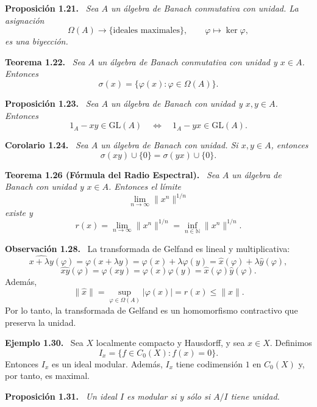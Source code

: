\documentclass[11pt]{article}
\newcommand{\GL}{\mathrm{GL}}
\newenvironment{teorema}[1]
  {\par\medskip\noindent\textbf{Teorema #1.}\ \itshape}
  {\par\medskip}
\newenvironment{proposicion}[1]
  {\par\medskip\noindent\textbf{Proposición #1.}\ \itshape}
  {\par\medskip}
\newenvironment{corolario}[1]
  {\par\medskip\noindent\textbf{Corolario #1.}\ \itshape}
  {\par\medskip}
\newenvironment{observacion}[1]
  {\par\medskip\noindent\textbf{Observación #1.}\ }
  {\par\medskip}
\newenvironment{ejemplo}[1]
  {\par\medskip\noindent\textbf{Ejemplo #1.}\ }
  {\par\medskip}
\begin{document}
\begin{proposicion}{1.21}
Sea $A$ un álgebra de Banach conmutativa con unidad. La asignación
\[
  \Omega(A)\longrightarrow\{\text{ideales maximales}\},
  \qquad
  \varphi\longmapsto\ker\varphi,
\]
es una biyección.
\end{proposicion}

\begin{teorema}{1.22}
Sea $A$ un álgebra de Banach conmutativa con unidad y $x\in A$. Entonces
\[
  \sigma(x)=\{\varphi(x):\varphi\in\Omega(A)\}.
\]
\end{teorema}

\begin{proposicion}{1.23}
Sea $A$ un álgebra de Banach con unidad y $x,y\in A$. Entonces
\[
  1_A-xy\in\GL(A)
  \quad\Longleftrightarrow\quad
  1_A-yx\in\GL(A).
\]
\end{proposicion}

\begin{corolario}{1.24}
Sea $A$ un álgebra de Banach con unidad. Si $x,y\in A$, entonces
\[
  \sigma(xy)\cup\{0\}
  =
  \sigma(yx)\cup\{0\}.
\]
\end{corolario}

\begin{teorema}{1.26 (Fórmula del Radio Espectral)}
Sea $A$ un álgebra de Banach con unidad y $x\in A$. Entonces el límite
\[
  \lim_{n\to\infty}\lVert x^n\rVert^{1/n}
\]
existe y
\[
  r(x)
  =\lim_{n\to\infty}\lVert x^n\rVert^{1/n}
  =\inf_{n\in\mathbb{N}}\lVert x^n\rVert^{1/n}.
\]
\end{teorema}

\begin{observacion}{1.28}
La transformada de Gelfand es lineal y multiplicativa:
\[
  \widehat{x+\lambda y}(\varphi)
  =\varphi(x+\lambda y)
  =\varphi(x)+\lambda\varphi(y)
  =\widehat{x}(\varphi)+\lambda\widehat{y}(\varphi),
\]
\[
  \widehat{xy}(\varphi)
  =\varphi(xy)
  =\varphi(x)\varphi(y)
  =\widehat{x}(\varphi)\widehat{y}(\varphi).
\]
Además,
\[
  \lVert\widehat{x}\rVert
  =\sup_{\varphi\in\Omega(A)}|\varphi(x)|
  =r(x)
  \leq\lVert x\rVert.
\]
Por lo tanto, la transformada de Gelfand es un homomorfismo contractivo que preserva la unidad.
\end{observacion}

\begin{ejemplo}{1.30}
Sea $X$ localmente compacto y Hausdorff, y sea $x\in X$. Definimos
\[
  I_x=\{f\in C_0(X):f(x)=0\}.
\]
Entonces $I_x$ es un ideal modular. Además, $I_x$ tiene codimensión $1$ en $C_0(X)$ y, por tanto, es maximal.
\end{ejemplo}

\begin{proposicion}{1.31}
Un ideal $I$ es modular si y sólo si $A/I$ tiene unidad.
\end{proposicion}
\end{document}
